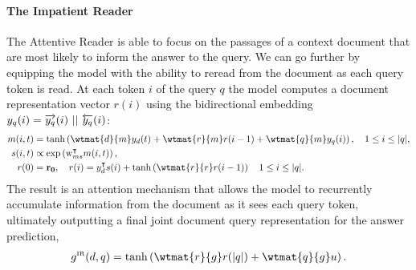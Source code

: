 \paragraph{The Impatient Reader}
The Attentive Reader is able to focus on the passages of a context document
that are most likely to inform the answer to the query. We can go further by
equipping the model with the ability to reread from the document as each query
token is read. At each token $i$ of the query $q$ the model computes a document
representation vector $r(i)$ using the bidirectional embedding $y_q(i) =
\overrightarrow{y_q}(i)\,\, ||\,\, \overleftarrow{y_q}(i)$:
\begin{align*}
  \attnIn(i, t)   &= \tanh\left(\wtmat{d}{\attnIn} \attnOver_d(t)
                   + \wtmat{\attnMix}{\attnIn} \attnMix(i-1)
                   + \wtmat{q}{\attnIn} y_q(i) \right)
                , \quad 1 \leq i \leq |q|,  \\
  \attnScore(i,t) &\propto \exp \left(\mathrm{w}_{\attnIn\attnScore}^\intercal
                   \attnIn(i,t) \right),\\
  \attnMix(0)     &= \mathbf{r_0}, \quad
                   \attnMix(i)     = \attnOver_d^\intercal \attnScore(i) +
                   \tanh\left(\wtmat{\attnMix}{\attnMix}\attnMix(i-1)\right)
  \quad 1 \leq i \leq |q|.
\end{align*}
The result is an attention mechanism that allows the model to recurrently
accumulate information from the document as it sees each query token, ultimately
outputting a final joint document query representation for the answer prediction,
\begin{align*}
  g^{\text{\tiny IR}}(d,q) = \tanh \left(\wtmat{\attnMix}{g} \attnMix(|q|) +
                             \wtmat{q}{g} \attnU \right).
\end{align*}

